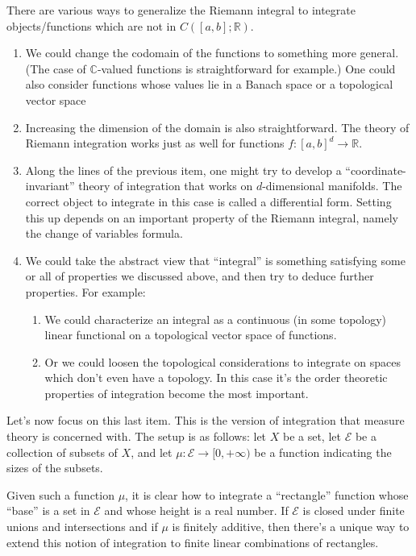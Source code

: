 \documentclass[a4paper,11pt,twoside]{amsart}
\newcommand{\C}{\mathbb{C}}
\newcommand{\R}{\mathbb{R}}
\theoremstyle{definition}
\begin{document}
There are various ways to generalize the Riemann integral to integrate objects/functions which are not in $C([a,b];\R)$.
\begin{enumerate}
    \item We could change the codomain of the functions to something more general. (The case of $\C$-valued functions is straightforward for example.) One could also consider functions whose values lie in a Banach space or a topological vector space
    \item Increasing the dimension of the domain is also straightforward. The theory of Riemann integration works just as well for functions $f \colon [a,b]^d \to \R$.
    \item Along the lines of the previous item, one might try to develop a ``coordinate-invariant'' theory of integration that works on $d$-dimensional manifolds. The correct object to integrate in this case is called a differential form. Setting this up depends on an important property of the Riemann integral, namely the change of variables formula.
    \item We could take the abstract view that ``integral'' is something satisfying some or all of properties we discussed above, and then try to deduce further properties. For example:
\begin{enumerate}
    \item We could characterize an integral as a continuous (in some topology) linear functional on a topological vector space of functions.
    \item Or we could loosen the topological considerations to integrate on spaces which don't even have a topology. In this case it's the order theoretic properties of integration become the most important.
\end{enumerate}
\end{enumerate}


Let's now focus on this last item. This is the version of integration that measure theory is concerned with. The setup is as follows: let $X$ be a set, let $\mathcal{E}$ be a collection of subsets of $X$, and let $\mu \colon \mathcal{E} \to [0,+\infty)$ be a function indicating the sizes of the subsets.

Given such a function $\mu$, it is clear how to integrate a ``rectangle'' function whose ``base'' is a set in $\mathcal{E}$ and whose height is a real number. If $\mathcal{E}$ is closed under finite unions and intersections and if $\mu$ is finitely additive, then there's a unique way to extend this notion of integration to finite linear combinations of rectangles.
\end{document}
